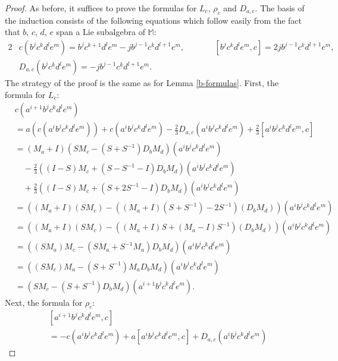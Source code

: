 \documentclass{amsart}
\theoremstyle{plain}
\theoremstyle{definition}
\begin{document}
\begin{proof}
As before, it suffices to prove the formulas for $L_c$, $\rho_c$ and $D_{a,c}$.
The basis of the induction consists of the following equations which follow
easily from the fact that $b$, $c$, $d$, $e$ span a Lie subalgebra of
$\mathbb{M}$:
  \allowdisplaybreaks
  \begin{alignat*}{2}
  &
  c ( b^j c^k d^l e^m )
  =
  b^j c^{k+1} d^l e^m - j b^{j-1} c^k d^{l+1} e^m,
  &\qquad
  &
  [ b^j c^k d^l e^m, c ]
  =
  2 j b^{j-1} c^k d^{l+1} e^m,
  \\
  &
  D_{a,c}( b^j c^k d^l e^m )
  =
  - j b^{j-1} c^k d^{l+1} e^m.
  \end{alignat*}
The strategy of the proof is the same as for Lemma \ref{b-formulas}. First, the
formula for $L_c$:
  \allowdisplaybreaks
  \begin{align*}
  &
  c ( a^{i+1} b^j c^k d^l e^m )
  \\
  &=
  a( c ( a^i b^j c^k d^l e^m ) )
  +
  c ( a^i b^j c^k d^l e^m )
  -
  \tfrac23 D_{a,c}( a^i b^j c^k d^l e^m )
  +
  \tfrac23 [ a^i b^j c^k d^l e^m, c ]
  \\
  &=
  ( M_a + I )
  (
  S M_c -( S + S^{-1} ) D_b M_d
  )
  ( a^i b^j c^k d^l e^m )
  \\
  &\quad
  -
  \tfrac23
  (
  ( I - S ) M_c + ( S - S^{-1} - I ) D_b M_d
  )
  ( a^i b^j c^k d^l e^m )
  \\
  &\quad
  +
  \tfrac23
  (
  ( I - S ) M_c + ( S + 2 S^{-1} - I ) D_b M_d
  )
  ( a^i b^j c^k d^l e^m )
  \\
  &=
  (
  ( M_a + I ) ( S M_c )
  -
  ( ( M_a + I ) ( S + S^{-1} ) - 2 S^{-1} )
  ( D_b M_d )
  )
  ( a^i b^j c^k d^l e^m )
  \\
  &=
  (
  ( M_a + I ) ( S M_c )
  -
  ( ( M_a + I ) S + ( M_a - I ) S^{-1} ) ( D_b M_d )
  )
  ( a^i b^j c^k d^l e^m )
  \\
  &=
  (
  ( S M_a ) M_c - ( S M_a + S^{-1} M_a ) D_b M_d
  )
  ( a^i b^j c^k d^l e^m )
  \\
  &=
  (
  ( S M_c ) M_a - ( S + S^{-1} ) M_a D_b M_d
  )
  ( a^i b^j c^k d^l e^m )
  \\
  &=
  ( S M_c - ( S + S^{-1} ) D_b M_d )
  ( a^{i+1} b^j c^k d^l e^m ).
  \end{align*}
Next, the formula for $\rho_c$:
  \allowdisplaybreaks
  \begin{align*}
  &
  [ a^{i+1} b^j c^k d^l e^m, c ]
  \\
  &=
  -
  c (a^i b^j c^k d^l e^m)
  +
  a [ a^i b^j c^k d^l e^m, c ]
  +
  D_{a,c} ( a^i b^j c^k d^l e^m )

\end{align*}
\end{proof}
\end{document}
